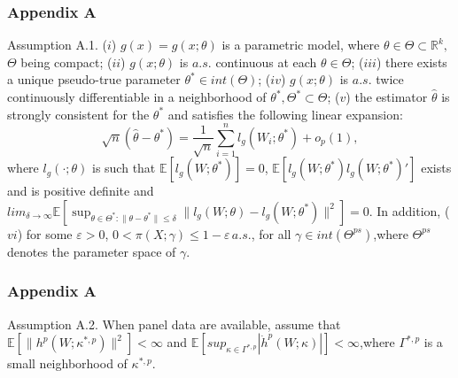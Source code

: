 \documentclass{beamer}
\begin{document}
\begin{frame}\frametitle{Appendix A}
    \footnotesize
    \begin{block}{Assumption A.1.}
    ($i$) $g(x) = g(x;\theta)$ is a parametric model, where $\theta \in \Theta \subset \mathbb{R}^{k},$ $\Theta$ being compact; ($ii$) $g(x;\theta)$ is $a.s.$ continuous at each $\theta \in \Theta$; ($iii$) there exists a unique pseudo-true parameter $\theta^{\ast} \in int(\Theta)$; ($iv$) $g(x;\theta)$ is $a.s.$ twice continuously differentiable in a neighborhood of $\theta^{\ast}, \Theta^{\ast} \subset \Theta$; ($v$) the estimator $\widehat{\theta}$ is strongly consistent for the $\theta^{\ast}$ and satisfies the following linear expansion:
    \footnotesize
    \begin{equation*}
        \sqrt{n}(\widehat{\theta} - \theta^{\ast}) = \frac{1}{\sqrt{n}} \sum_{i = 1}^{n}l_{g}(W_{i};\theta^{\ast}) + o_{p}(1),
    \end{equation*}
    \normalsize
    \footnotesize
    where $l_{g}(\cdot;\theta)$ is such that $\mathbb{E}[l_{g}(W;\theta^{\ast})] = 0$, $\mathbb{E}[l_{g}(W;\theta^{\ast})l_{g}(W;\theta^{\ast})']$ exists and is positive definite and $ lim_{\delta \to \infty} \mathbb{E}\left[\sup_{\theta \in \Theta^{\ast}:\|\theta-\theta^{\ast}\| \leq \delta}\|l_{g}(W;\theta)-l_{g}(W;\theta^{\ast})\|^{2} \right] = 0$. In addition, ($vi$) for some $\varepsilon > 0$, $0 < \pi(X;\gamma) \leq 1 - \varepsilon \,a.s.$, for all $\gamma \in int(\Theta^{ps})$,where $\Theta^{ps}$ denotes the parameter space of $\gamma$.
    \normalsize
    \end{block}
    \normalsize
\end{frame}

\begin{frame}\frametitle{Appendix A}
    \begin{block}{Assumption A.2.}
        When panel data are available, assume that $\mathbb{E}[\|h^{p}(W;\kappa^{\ast, p})\|^{2}] < \infty$ and $\mathbb{E}[sup_{\kappa \in \Gamma^{\ast, p}}|\dot{h}^{p}(W;\kappa)|] < \infty$,where $\Gamma^{\ast, p}$ is a small neighborhood of $\kappa^{\ast, p}$.
    \end{block}
\end{frame}
\end{document}
